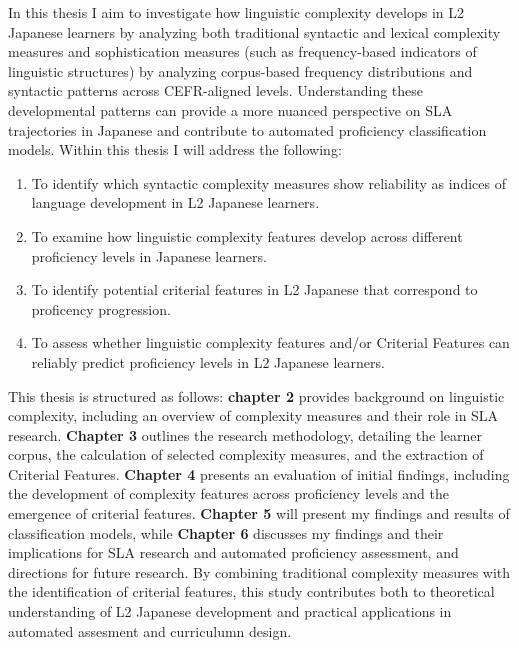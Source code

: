 In this thesis I aim to  investigate how linguistic complexity develops in L2 Japanese learners by analyzing
both traditional syntactic and lexical complexity measures and sophistication measures (such as frequency-based
indicators of linguistic structures) by analyzing corpus-based frequency distributions and syntactic patterns across CEFR-aligned levels. Understanding these developmental patterns can provide a more nuanced
perspective on SLA trajectories in Japanese and contribute to automated proficiency classification models. Within
this thesis I will address the following:
\begin{enumerate}
    \item To identify which syntactic complexity measures show reliability as indices of language development in
    L2 Japanese learners.%
    \item To examine how linguistic complexity features develop across different proficiency levels in Japanese
    learners.%
    \item To identify potential criterial features in L2 Japanese that correspond to proficency progression.
    \item To assess whether linguistic complexity features and/or Criterial Features can reliably predict proficiency
    levels in L2 Japanese
    learners.
\end{enumerate}

This thesis is structured as follows: \textbf{chapter 2} provides background on linguistic complexity, including an
overview of complexity measures and their role in SLA research.
\textbf{Chapter 3} outlines the research methodology, detailing the learner corpus, the calculation of selected
complexity measures, and the extraction of Criterial Features.
 \textbf{Chapter 4} presents an evaluation of initial findings, including the development of complexity features across proficiency levels and the emergence of criterial features.
\textbf{Chapter 5 }will present my findings and results of classification models, while \textbf{Chapter 6}
discusses my findings and their implications for SLA research and automated proficiency assessment, and directions for
future research. By combining traditional complexity measures with the identification of criterial features, this
study contributes both to theoretical understanding of L2 Japanese development and practical applications in
automated assesment and curriculumn design. %